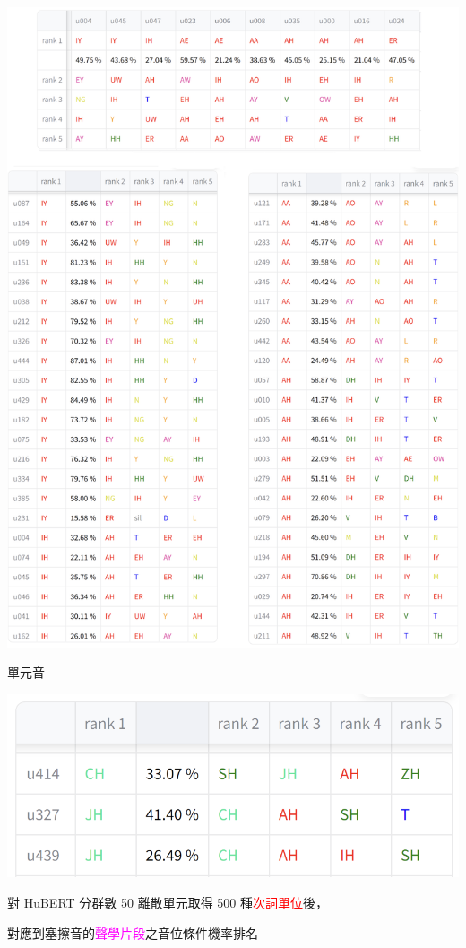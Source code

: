 {{        \begin{table}
            \ContinuedFloat
            \centering
            \begin{subtable}{\textwidth}
                \centering
                \includegraphics[width=0.8\linewidth]{figures/ch4figs/vow_phn.png}
                \caption{單元音}
                \label{subtabfig:hub-u050-ap0500-vowobs}
            \end{subtable}

            \label{tabfig:hub-u050-phnobserver--3}
        \end{table}
    }

    {
        \begin{table}
            \centering
            \includegraphics[width=0.8\linewidth]{figures/ch4figs/aff-hub50-500.png}
            \caption{對 HuBERT 分群數 50 離散單元取得 500 種\textcolor{red}{次詞單位}後，}
            對應到塞擦音的\textcolor{magenta}{聲學片段}之音位條件機率排名
            \label{tabfig:aff}
        \end{table}

}}
